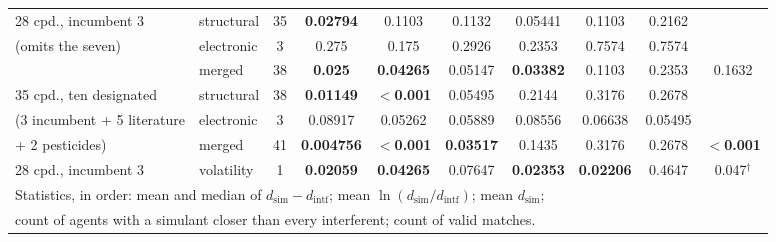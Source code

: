 \begin{table}[htb]
\begin{tabular}{llcccccccc}
\hline
28 cpd., incumbent 3   & structural  & 35 & \textbf{0.02794} & 0.1103 & 0.1132 & 0.05441 & 0.1103 & 0.2162 &  \\
\quad (omits the seven) & electronic  &  3 & 0.275 & 0.175 & 0.2926 & 0.2353 & 0.7574 & 0.7574 &  \\
                       & merged      & 38 & \textbf{0.025} & \textbf{0.04265} & 0.05147 & \textbf{0.03382} & 0.1103 & 0.2353 & 0.1632 \\
\hline
35 cpd., ten designated & structural  & 38 & \textbf{0.01149} & \textbf{$<$0.001} & 0.05495 & 0.2144 & 0.3176 & 0.2678 &  \\
\quad (3 incumbent + 5 literature & electronic  &  3 & 0.08917 & 0.05262 & 0.05889 & 0.08556 & 0.06638 & 0.05495 &  \\
\quad + 2 pesticides)  & merged      & 41 & \textbf{0.004756} & \textbf{$<$0.001} & \textbf{0.03517} & 0.1435 & 0.3176 & 0.2678 & \textbf{$<$0.001} \\
\hline
28 cpd., incumbent 3   & volatility  &  1 & \textbf{0.02059} & \textbf{0.04265} & 0.07647 & \textbf{0.02353} & \textbf{0.02206} & 0.4647 & 0.047$^{\dagger}$ \\
\hline
\hline
\multicolumn{10}{l}{\footnotesize Statistics, in order: mean and median of
$d_\mathrm{sim}-d_\mathrm{intf}$; mean $\ln(d_\mathrm{sim}/d_\mathrm{intf})$;
mean $d_\mathrm{sim}$;}\\
\multicolumn{10}{l}{\footnotesize count of agents with a simulant closer than
every interferent; count of valid matches.}\\
\end{tabular}
\end{table}
